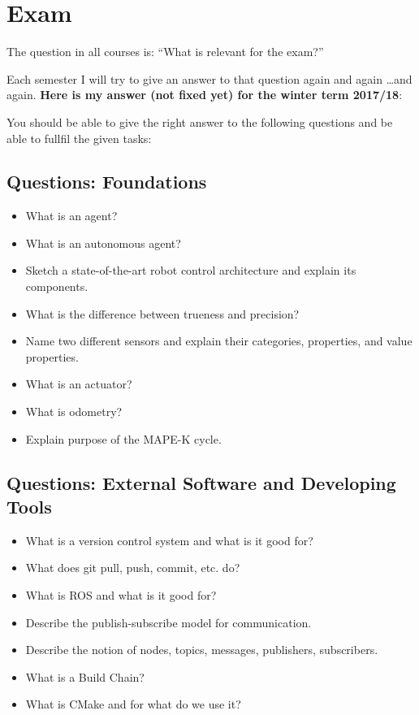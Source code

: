 \chapter{Exam}
\label{chap:Exam}

The question in all courses is: ``What is relevant for the exam?''

Each semester I will try to give an answer to that question again and again \ldots and again. \textbf{Here is my answer (not fixed yet) for the winter term 2017/18}:

You should be able to give the right answer to the following questions and be able to fullfil the given tasks:

\section{Questions: Foundations}
\label{sec:questions_foundations}

\begin{itemize}
 \item What is an agent?
 \item What is an autonomous agent?
 \item Sketch a state-of-the-art robot control architecture and explain its components.
 \item What is the difference between trueness and precision?
 \item Name two different sensors and explain their categories, properties, and value properties.
 \item What is an actuator?
 \item What is odometry?
 \item Explain purpose of the MAPE-K cycle.
\end{itemize}

\section{Questions: External Software and Developing Tools}
\label{sec:questions_tools}

\begin{itemize}
 \item What is a version control system and what is it good for?
 \item What does git pull, push, commit, etc. do?
 \item What is ROS and what is it good for?
 \item Describe the publish-subscribe model for communication.
 \item Describe the notion of nodes, topics, messages, publishers, subscribers.
 \item What is a Build Chain?
 \item What is CMake and for what do we use it?
\end{itemize}


